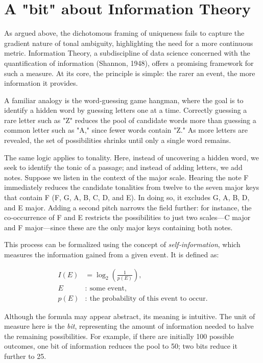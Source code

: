 \documentclass[10pt,twocolumn]{article}
\numberwithin{equation}{section} %
\begin{document}
    \section{A "bit" about Information Theory}

    As argued above, the dichotomous framing of uniqueness fails to capture the gradient nature of tonal ambiguity, highlighting the need for a more continuous metric.
    Information Theory, a subdiscipline of data science concerned with the quantification of information (Shannon, 1948), offers a promising framework for such a measure.
    At its core, the principle is simple: the rarer an event, the more information it provides.

    A familiar analogy is the word‑guessing game hangman, where the goal is to identify a hidden word by guessing letters one at a time.
    Correctly guessing a rare letter such as "Z" reduces the pool of candidate words more than guessing a common letter such as "A," since fewer words contain "Z."
    As more letters are revealed, the set of possibilities shrinks until only a single word remains.

    The same logic applies to tonality.
    Here, instead of uncovering a hidden word, we seek to identify the tonic of a passage; and instead of adding letters, we add notes.
    Suppose we listen in the context of the major scale.
    Hearing the note F immediately reduces the candidate tonalities from twelve to the seven major keys that contain F (F, G\text{$\flat$}, A\text{$\flat$}, B\text{$\flat$}, C, D\text{$\flat$}, and E\text{$\flat$}).
    In doing so, it excludes G, A, B, D, and E major.
    Adding a second pitch narrows the field further: for instance, the co‑occurrence of F and E restricts the possibilities to just two scales—C major and F major—since these are the only major keys containing both notes.

    This process can be formalized using the concept of \textit{self}\textit{‑}\textit{information}, which measures the information gained from a given event.
    It is defined as:

    \begin{align}
        I(E) &= \log_{2} \left( \frac{1}{p(E)} \right), \\
        E &:\ \text{some event}, \\
        p(E) &:\ \text{the probability of this event to occur}.
    \end{align}


    Although the formula may appear abstract, its meaning is intuitive.
    The unit of measure here is the \textit{bit}, representing the amount of information needed to halve the remaining possibilities.
    For example, if there are initially 100 possible outcomes, one bit of information reduces the pool to 50; two bits reduce it further to 25.
\end{document}
